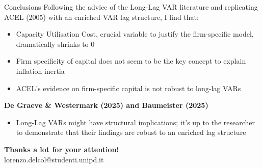 \documentclass[11pt]{beamer}
\makeatletter
\newcommand{\email}{lorenzo.delcol@studenti.unipd.it}
\makeatother
\begin{document}
\begin{frame}{Conclusions}
    Following the advice of the Long-Lag VAR literature and replicating ACEL (2005) with an enriched VAR lag structure, I find that:
    \begin{itemize}
        \item Capacity Utilisation Cost, crucial variable to justify the firm-specific model, dramatically shrinks to 0
        \item Firm specificity of capital does not seem to be the key concept to explain inflation inertia
        \item ACEL's evidence on firm-specific capital is not robust to long-lag VARs
    \end{itemize} 
    \vspace{0.5cm}
    \pause

    \hfill {\color{PadovaRed}\small \textbf{De Graeve \& Westermark (2025) and Baumeister (2025)} }
    \begin{itemize}
        \item Long-Lag VARs might have structural implications; it's up to the researcher to demonstrate that their findings are robust to an enriched lag structure
    \end{itemize}
    
\end{frame}




\begin{frame}
\begin{center}
    \Large \textbf{\textcolor{PadovaRed}{Thanks a lot for your attention!}} \\
    \vspace{1cm}
    \normalsize \email
\end{center}
\end{frame}

\appendix

\end{document}
